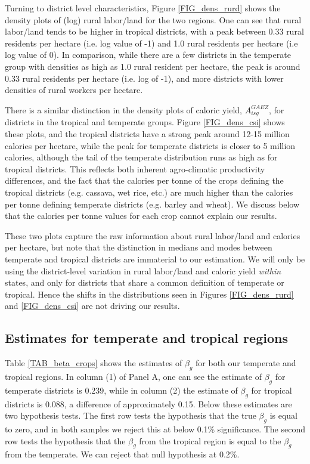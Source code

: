 \documentclass[11pt]{article}
\begin{document}
Turning to district level characteristics, Figure \ref{FIG_dens_rurd} shows the density plots of (log) rural labor/land for the two regions. One can see that rural labor/land tends to be higher in tropical districts, with a peak between 0.33 rural residents per hectare (i.e. log value of -1) and 1.0 rural residents per hectare (i.e log value of 0). In comparison, while there are a few districts in the temperate group with densities as high as 1.0 rural resident per hectare, the peak is around 0.33 rural residents per hectare (i.e. log of -1), and more districts with lower densities of rural workers per hectare. 

There is a similar distinction in the density plots of caloric yield, $A_{isg}^{GAEZ}$, for districts in the tropical and temperate groups. Figure \ref{FIG_dens_csi} shows these plots, and the tropical districts have a strong peak around 12-15 million calories per hectare, while the peak for temperate districts is closer to 5 million calories, although the tail of the temperate distribution runs as high as for tropical districts. This reflects both inherent agro-climatic productivity differences, and the fact that the calories per tonne of the crops defining the tropical districts (e.g. cassava, wet rice, etc.) are much higher than the calories per tonne defining temperate districts (e.g. barley and wheat). We discuss below that the calories per tonne values for each crop cannot explain our results.

These two plots capture the raw information about rural labor/land and calories per hectare, but note that the distinction in medians and modes between temperate and tropical districts are immaterial to our estimation. We will only be using the district-level variation in rural labor/land and caloric yield \textit{within} states, and only for districts that share a common definition of temperate or tropical. Hence the shifts in the distributions seen in Figures \ref{FIG_dens_rurd} and \ref{FIG_dens_csi} are not driving our results. 

\subsection{Estimates for temperate and tropical regions}
Table \ref{TAB_beta_crops} shows the estimates of $\beta_g$ for both our temperate and tropical regions. In column (1) of Panel A, one can see the estimate of $\beta_g$ for temperate districts is 0.239, while in column (2) the estimate of $\beta_g$ for tropical districts is 0.088, a difference of approximately 0.15. Below these estimates are two hypothesis tests. The first row tests the hypothesis that the true $\beta_g$ is equal to zero, and in both samples we reject this at below 0.1\% significance. The second row tests the hypothesis that the $\beta_g$ from the tropical region is equal to the $\beta_g$ from the temperate. We can reject that null hypothesis at 0.2\%.
\end{document}
